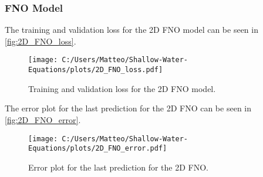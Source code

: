 \subsubsection*{FNO Model}
The training and validation loss for the 2D FNO model can be seen in \autoref{fig:2D_FNO_loss}.
\begin{figure}[H]
    \centering
    \texttt{[image: C:/Users/Matteo/Shallow-Water-Equations/plots/2D\_FNO\_loss.pdf]}
    \caption{Training and validation loss for the 2D FNO model.}\label{fig:2D_FNO_loss}
\end{figure}

The error plot for the last prediction for the 2D FNO can be seen in \autoref{fig:2D_FNO_error}.
\begin{figure}[H]
    \centering
    \texttt{[image: C:/Users/Matteo/Shallow-Water-Equations/plots/2D\_FNO\_error.pdf]}
    \caption{Error plot for the last prediction for the 2D FNO.}\label{fig:2D_FNO_error}
\end{figure}


